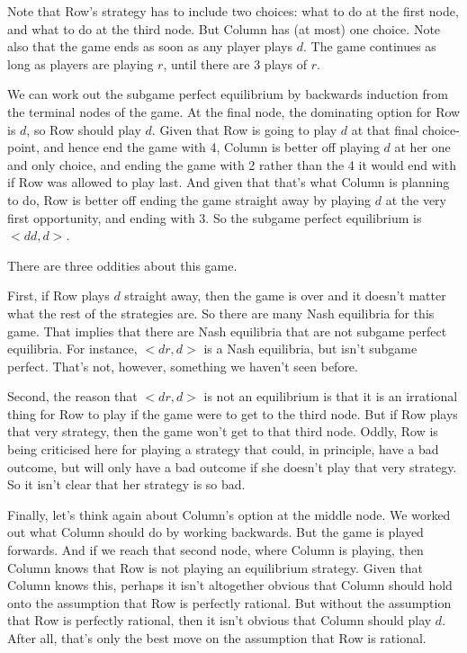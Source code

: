 Note that Row's strategy has to include two choices: what to do at the first node, and what to do at the third node. But Column has (at most) one choice. Note also that the game ends as soon as any player plays $d$. The game continues as long as players are playing $r$, until there are 3 plays of $r$.

We can work out the subgame perfect equilibrium by backwards induction from the terminal nodes of the game. At the final node, the dominating option for Row is $d$, so Row should play $d$. Given that Row is going to play $d$ at that final choice-point, and hence end the game with 4, Column is better off playing $d$ at her one and only choice, and ending the game with 2 rather than the 4 it would end with if Row was allowed to play last. And given that that's what Column is planning to do, Row is better off ending the game straight away by playing $d$ at the very first opportunity, and ending with 3. So the subgame perfect equilibrium is $<dd, d>$.

There are three oddities about this game. 

First, if Row plays $d$ straight away, then the game is over and it doesn't matter what the rest of the strategies are. So there are many Nash equilibria for this game. That implies that there are Nash equilibria that are not subgame perfect equilibria. For instance, $<dr, d>$ is a Nash equilibria, but isn't subgame perfect.  That's not, however, something we haven't seen before.

Second, the reason that $<dr, d>$ is not an equilibrium is that it is an irrational thing for Row to play if the game were to get to the third node. But if Row plays that very strategy, then the game won't get to that third node. Oddly, Row is being criticised here for playing a strategy that could, in principle, have a bad outcome, but will only have a bad outcome if she doesn't play that very strategy. So it isn't clear that her strategy is so bad.

Finally, let's think again about Column's option at the middle node. We worked out what Column should do by working backwards. But the game is played forwards. And if we reach that second node, where Column is playing, then Column knows that Row is not playing an equilibrium strategy. Given that Column knows this, perhaps it isn't altogether obvious that Column should hold onto the assumption that Row is perfectly rational. But without the assumption that Row is perfectly rational, then it isn't obvious that Column should play $d$. After all, that's only the best move on the assumption that Row is rational.

